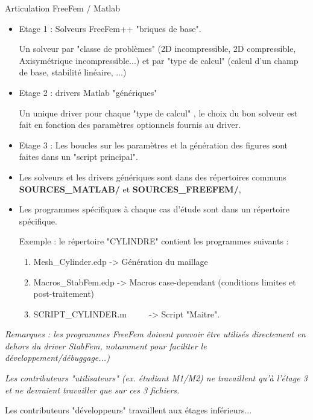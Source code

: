 \documentclass{beamer}
\newcommand{\ssp}{\vspace{.2cm} }
\begin{document}
\begin{frame}{Articulation FreeFem / Matlab}

\scriptsize

\begin{itemize}[<+->]

\item 
Etage 1 : Solveurs FreeFem++ "briques de base".

Un solveur par "classe de problèmes" (2D incompressible, 2D compressible, Axisymétrique incompressible...) et par "type de calcul" (calcul d'un champ de base, stabilité linéaire, ...)


\item  Etage 2 : drivers Matlab "génériques"  

Un unique driver pour chaque "type de calcul" , le choix du bon solveur est fait en fonction 
des paramètres optionnels fournis au driver.
  

  
\item Etage 3 : Les boucles sur les paramètres et la génération des figures sont faites dans un "script principal".

\item Les solveurs et les drivers génériques sont dans des répertoires communs {\bf SOURCES\_MATLAB/} et {\bf SOURCES\_FREEFEM/}, 

\item Les programmes spécifiques à chaque cas d'étude sont dans un répertoire spécifique.

Exemple : le répertoire "CYLINDRE" contient les programmes suivants :

\begin{enumerate}
\scriptsize
\item Mesh\_Cylinder.edp		\qquad -> Génération du maillage

\item Macros\_StabFem.edp \qquad -> Macros case-dependant (conditions limites et post-traitement)   

\item SCRIPT\_CYLINDER.m $\qquad$ -> Script "Maitre".

\end{enumerate}
\end{itemize}
\pause 


{\em Remarques : les programmes FreeFem doivent pouvoir être utilisés directement en dehors du driver StabFem, 
notamment pour faciliter le développement/débuggage...)}  

\ssp 

{\em Les contributeurs "utilisateurs" (ex. étudiant M1/M2) ne travaillent qu'à l'étage 3 et ne devraient travailler que sur ces 3 fichiers.
\ssp

Les contributeurs "développeurs" travaillent aux étages inférieurs...}


\end{frame}
\end{document}
